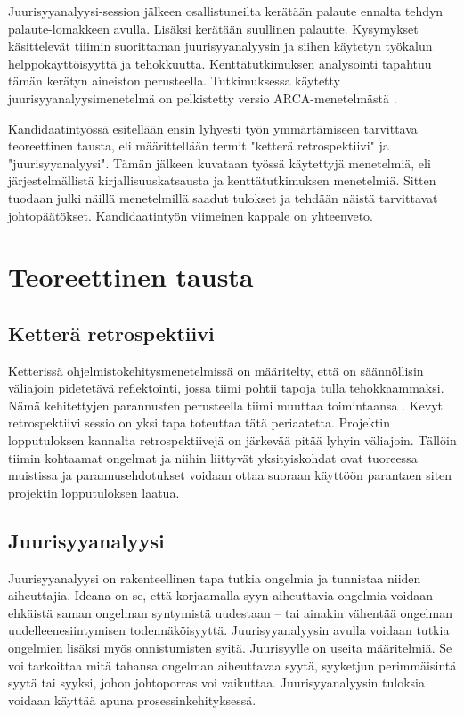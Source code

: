 Juurisyyanalyysi-session jälkeen osallistuneilta kerätään palaute ennalta tehdyn palaute-lomakkeen avulla. Lisäksi kerätään suullinen palautte. Kysymykset käsittelevät tiiimin suorittaman juurisyyanalyysin ja siihen käytetyn työkalun helppokäyttöisyyttä ja tehokkuutta. Kenttätutkimuksen analysointi tapahtuu tämän kerätyn aineiston perusteella. Tutkimuksessa käytetty juurisyyanalyysimenetelmä on pelkistetty versio ARCA-menetelmästä \citep{Lehtinen2011}.

Kandidaatintyössä esitellään ensin lyhyesti työn ymmärtämiseen tarvittava teoreettinen tausta, eli määrittellään termit "ketterä retrospektiivi" ja "juurisyyanalyysi". Tämän jälkeen kuvataan työssä käytettyjä menetelmiä, eli järjestelmällistä kirjallisuuskatsausta ja kenttätutkimuksen menetelmiä. Sitten tuodaan julki näillä menetelmillä saadut tulokset ja tehdään näistä tarvittavat johtopäätökset. Kandidaatintyön viimeinen kappale on yhteenveto.

\section{Teoreettinen tausta}
\subsection{Ketterä retrospektiivi}
Ketterissä ohjelmistokehitysmenetelmissä on määritelty, että on säännöllisin väliajoin pidetetävä reflektointi, jossa tiimi pohtii tapoja tulla tehokkaammaksi. Nämä kehitettyjen parannusten perusteella tiimi muuttaa toimintaansa \citep{AgileManifestoPrinciples}. Kevyt retrospektiivi sessio on yksi tapa toteuttaa tätä periaatetta. Projektin lopputuloksen kannalta retrospektiivejä on järkevää pitää lyhyin väliajoin. Tällöin tiimin kohtaamat ongelmat ja niihin liittyvät yksityiskohdat ovat tuoreessa muistissa ja parannusehdotukset voidaan ottaa suoraan käyttöön parantaen siten projektin lopputuloksen laatua. \citep{Cockburn2002}

\subsection{Juurisyyanalyysi}
Juurisyyanalyysi on rakenteellinen tapa tutkia ongelmia ja tunnistaa niiden aiheuttajia. Ideana on se, että korjaamalla syyn aiheuttavia ongelmia voidaan ehkäistä saman ongelman syntymistä uudestaan -- tai ainakin vähentää ongelman uudelleenesiintymisen todennäköisyyttä. \citep{Lehtinen2011} Juurisyyanalyysin avulla voidaan tutkia ongelmien lisäksi myös onnistumisten syitä. \citep{Bjornson2009} Juurisyylle on useita määritelmiä. Se voi tarkoittaa mitä tahansa ongelman aiheuttavaa syytä, syyketjun perimmäisintä syytä tai syyksi, johon johtoporras voi vaikuttaa. Juurisyyanalyysin tuloksia voidaan käyttää apuna prosessinkehityksessä. \citep{Lehtinen2011}

